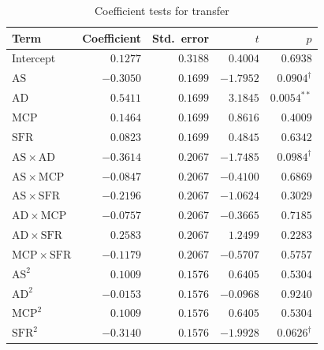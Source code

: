 \documentclass[12pt]{article}
\begin{document}
\begin{table}[htbp]
\centering
\small
\caption{Coefficient tests for transfer}
\label{tab:coef-transfer}
\begin{tabular}{lrrrr}
\toprule
Term & Coefficient & Std.\ error & $t$ & $p$ \\
\midrule
Intercept                         & $ 0.1277$ & $0.3188$ & $ 0.4004$ & $0.6938$ \\
$\mathrm{AS}$                     & $-0.3050$ & $0.1699$ & $-1.7952$ & $0.0904^{\dagger}$ \\
$\mathrm{AD}$                     & $ 0.5411$ & $0.1699$ & $ 3.1845$ & $0.0054^{**}$ \\
$\mathrm{MCP}$                    & $ 0.1464$ & $0.1699$ & $ 0.8616$ & $0.4009$ \\
$\mathrm{SFR}$                    & $ 0.0823$ & $0.1699$ & $ 0.4845$ & $0.6342$ \\
$\mathrm{AS}\times\mathrm{AD}$    & $-0.3614$ & $0.2067$ & $-1.7485$ & $0.0984^{\dagger}$ \\
$\mathrm{AS}\times\mathrm{MCP}$   & $-0.0847$ & $0.2067$ & $-0.4100$ & $0.6869$ \\
$\mathrm{AS}\times\mathrm{SFR}$   & $-0.2196$ & $0.2067$ & $-1.0624$ & $0.3029$ \\
$\mathrm{AD}\times\mathrm{MCP}$   & $-0.0757$ & $0.2067$ & $-0.3665$ & $0.7185$ \\
$\mathrm{AD}\times\mathrm{SFR}$   & $ 0.2583$ & $0.2067$ & $ 1.2499$ & $0.2283$ \\
$\mathrm{MCP}\times\mathrm{SFR}$  & $-0.1179$ & $0.2067$ & $-0.5707$ & $0.5757$ \\
$\mathrm{AS}^{2}$                 & $ 0.1009$ & $0.1576$ & $ 0.6405$ & $0.5304$ \\
$\mathrm{AD}^{2}$                 & $-0.0153$ & $0.1576$ & $-0.0968$ & $0.9240$ \\
$\mathrm{MCP}^{2}$                & $ 0.1009$ & $0.1576$ & $ 0.6405$ & $0.5304$ \\
$\mathrm{SFR}^{2}$                & $-0.3140$ & $0.1576$ & $-1.9928$ & $0.0626^{\dagger}$ \\
\bottomrule
\end{tabular}

\medskip

\end{table}
\end{document}
